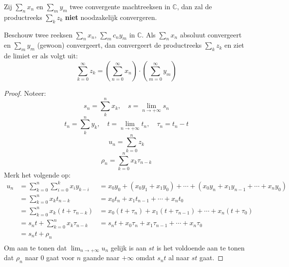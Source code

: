 \documentclass[main.tex]{subfiles}
\begin{document}
\begin{gst}
  Zij $\sum_{n}x_{n}$ en $\sum_{m}y_{m}$ twee convergente machtreeksen in $\mathbb{C}$, dan zal de productreeks $\sum_{k}z_{k}$ \textbf{niet} noodzakelijk convergeren.
\end{gst}

\begin{bst}
  Beschouw twee reeksen $\sum_{n}x_{n}$, $\sum_{m}c_{n}y_{m}$ in $\mathbb{C}$.
  Als $\sum_{n}x_{n}$ absoluut convergeert en $\sum_{m}y_{m}$ (gewoon) convergeert, dan convergeert de productreeks $\sum_{k}z_{k}$ en ziet de limiet er als volgt uit:
  \[ \sum_{k=0}^{\infty}z_{k} = \left(\sum_{n=0}^{\infty}x_{n}\right) \cdot \left(\sum_{m=0}^{\infty}y_{m}\right) \]

  \begin{proof}
    Noteer:
    \[
    s_{n} = \sum_{k}^{n}x_{k},\quad
    s = \lim_{n\rightarrow +\infty}s_{n}
    \]
    \[
    t_{n} = \sum_{k}^{n}y_{k},\quad
    t = \lim_{n\rightarrow +\infty}t_{n},\quad
    \tau_{n} = t_{n}-t
    \]
    \[
    u_{n} = \sum_{k=0}^{n}z_{k}
    \]
    \[ \rho_{n} = \sum_{k=0}^{n}x_{k}\tau_{n-k} \]
    Merk het volgende op:
    \[
    \begin{array}{rll}
      u_{n}
      &= \sum_{k=0}^{n}\sum_{i=0}^{k}x_{i}y_{k-i}
      &= x_{0}y_{0} + (x_{0}y_{1}+x_{1}y_{0}) + \dotsb + (x_{0}y_{n} + x_{1}y_{n-1} + \dotsb + x_{n}y_{0})\\
      &= \sum_{k=0}^{n}x_{k}t_{n-k}
      &= x_{0}t_{n} + x_{1}t_{n-1} + \dotsb + x_{n}t_{0}\\
      &= \sum_{k=0}^{n}x_{k}(t+\tau_{n-k})
      &= x_{0}(t+\tau_{n}) + x_{1}(t+\tau_{n-1}) + \dotsb + x_{n}(t+\tau_{0})\\
      &= s_{n}t + \sum_{k=0}^{n}x_{k}\tau_{n-k}
      &= s_{n}t + x_{0}\tau_{n} + x_{1}\tau_{n-1} + \dotsb + x_{n}\tau_{0}\\
      &= s_{n}t + \rho_{n}\\
    \end{array}
    \]
    Om aan te tonen dat $\lim_{n\rightarrow +\infty}u_{n}$ gelijk is aan $st$ is het voldoende aan te tonen dat $\rho_{n}$ naar $0$ gaat voor $n$ gaande naar $+\infty$ omdat $s_{n}t$ al naar $st$ gaat.
    

\end{proof}
\end{bst}
\end{document}

